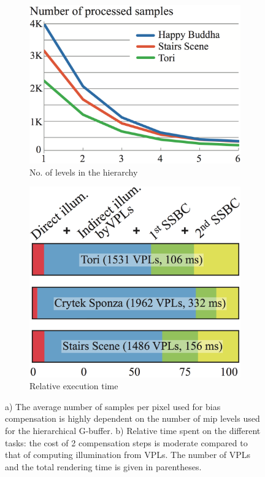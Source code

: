 \begin{figure}
	\begin{subfigure}[b]{.48\textwidth}
		\includegraphics[width=1.\textwidth]{graphics/ir/ir-7-7}
		\caption{No. of levels in the hierarchy}
	\end{subfigure}
	\begin{subfigure}[b]{.48\textwidth}
		\includegraphics[width=1.\textwidth]{graphics/ir/ir-7-8}
		\caption{Relative execution time}
	\end{subfigure}
	\caption{a) The average number of samples per pixel used for bias compensation is highly dependent on the number of mip levels used for the hierarchical G-buffer. b) Relative time spent on the different tasks: the cost of 2 compensation steps is moderate compared to that of computing illumination from VPLs. The number of VPLs and the total rendering time is given in parentheses.}
\end{figure}




